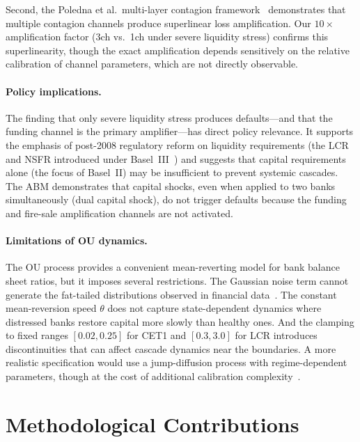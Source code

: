 Second, the Poledna et al.\ multi-layer contagion framework~\cite{poledna2015economics} demonstrates that multiple contagion channels produce superlinear loss amplification. Our $10\times$ amplification factor (3ch vs.\ 1ch under severe liquidity stress) confirms this superlinearity, though the exact amplification depends sensitively on the relative calibration of channel parameters, which are not directly observable.

\paragraph{Policy implications.}
The finding that only severe liquidity stress produces defaults---and that the funding channel is the primary amplifier---has direct policy relevance. It supports the emphasis of post-2008 regulatory reform on liquidity requirements (the LCR and NSFR introduced under Basel~III~\cite{drehmann2013model,borio2011macroprudential}) and suggests that capital requirements alone (the focus of Basel~II) may be insufficient to prevent systemic cascades. The ABM demonstrates that capital shocks, even when applied to two banks simultaneously (dual capital shock), do not trigger defaults because the funding and fire-sale amplification channels are not activated.

\paragraph{Limitations of OU dynamics.}
The OU process provides a convenient mean-reverting model for bank balance sheet ratios, but it imposes several restrictions. The Gaussian noise term cannot generate the fat-tailed distributions observed in financial data~\cite{mantegna1999introduction}. The constant mean-reversion speed $\theta$ does not capture state-dependent dynamics where distressed banks restore capital more slowly than healthy ones. And the clamping to fixed ranges $[0.02, 0.25]$ for CET1 and $[0.3, 3.0]$ for LCR introduces discontinuities that can affect cascade dynamics near the boundaries. A more realistic specification would use a jump-diffusion process with regime-dependent parameters, though at the cost of additional calibration complexity~\cite{farmer2009economy,thurner2012leverage}.


\section{Methodological Contributions}
\label{sec:contributions}

